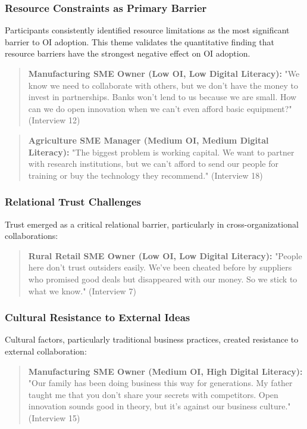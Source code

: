 \subsubsection{Resource Constraints as Primary Barrier}
Participants consistently identified resource limitations as the most significant barrier to OI adoption. This theme validates the quantitative finding that resource barriers have the strongest negative effect on OI adoption.

\begin{quote}
\textbf{Manufacturing SME Owner (Low OI, Low Digital Literacy):} "We know we need to collaborate with others, but we don't have the money to invest in partnerships. Banks won't lend to us because we are small. How can we do open innovation when we can't even afford basic equipment?" (Interview 12)
\end{quote}

\begin{quote}
\textbf{Agriculture SME Manager (Medium OI, Medium Digital Literacy):} "The biggest problem is working capital. We want to partner with research institutions, but we can't afford to send our people for training or buy the technology they recommend." (Interview 18)
\end{quote}

\subsubsection{Relational Trust Challenges}
Trust emerged as a critical relational barrier, particularly in cross-organizational collaborations:

\begin{quote}
\textbf{Rural Retail SME Owner (Low OI, Low Digital Literacy):} "People here don't trust outsiders easily. We've been cheated before by suppliers who promised good deals but disappeared with our money. So we stick to what we know." (Interview 7)
\end{quote}

\subsubsection{Cultural Resistance to External Ideas}
Cultural factors, particularly traditional business practices, created resistance to external collaboration:

\begin{quote}
\textbf{Manufacturing SME Owner (Medium OI, High Digital Literacy):} "Our family has been doing business this way for generations. My father taught me that you don't share your secrets with competitors. Open innovation sounds good in theory, but it's against our business culture." (Interview 15)
\end{quote}

